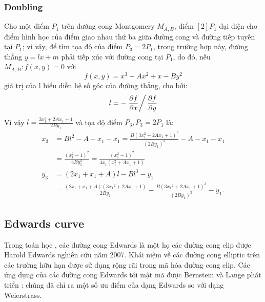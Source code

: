 \documentclass[a4paper,12pt]{report}
\begin{document}
\subsubsection{Doubling}
Cho một điểm $P_{1}$ trên đường cong Montgomery $M_{A, B}$, điểm $[2]P_1$ đại diện cho điểm hình học của điểm giao nhau thứ ba giữa đường cong và đường tiếp tuyến tại $P_{1}$; vì vậy, để tìm tọa độ của điểm $P_3 = 2P_1$, trong trường hợp này, đường thẳng $y  =  lx  +  m$ phải tiếp xúc với đường cong tại $P_{1}$, do đó, nếu $M_{A, B}: f(x, y) = 0$ với
\begin{displaymath}
f(x, y) = x^3 + Ax^2 + x - By^2
\end{displaymath}
giá trị của l biểu diễn hệ số góc của đường thẳng, cho bởi:
\begin{displaymath}
 l=-\left.\frac{\partial f}{\partial x}\right/\frac{\partial f}{\partial y}
\end{displaymath}
Vì vậy $\displaystyle l = \frac{3x_1^2 + 2Ax_1 + 1}{2By_1}$ và tọa độ điểm $P_3,P_3 = 2P_1$ là:
\begin{displaymath}
{\displaystyle {\begin{aligned}x_{3}&=Bl^{2}-A-x_{1}-x_{1}={\frac {B(3x_{1}^{2}+2Ax_{1}+1)^{2}}{(2By_{1})^{2}}}-A-x_{1}-x_{1}\\&={\frac {(x_{1}^{2}-1)^{2}}{4By_{1}^{2}}}={\frac {(x_{1}^{2}-1)^{2}}{4x_{1}(x_{1}^{2}+Ax_{1}+1)}}\\[8pt]y_{3}&=(2x_{1}+x_{1}+A)l-Bl^{3}-y_{1}\\&={\frac {(2x_{1}+x_{1}+A)(3{x_{1}}^{2}+2Ax_{1}+1)}{2By_{1}}}-{\frac {B(3{x_{1}}^{2}+2Ax_{1}+1)^{3}}{(2By_{1})^{3}}}-y_{1}.\end{aligned}}}
\end{displaymath}
\subsection*{Edwards curve}
Trong toán học , các đường cong Edwards là một họ các đường cong elip được Harold Edwards nghiên cứu năm 2007. Khái niệm về các đường cong elliptic trên các trường hữu hạn được sử dụng rộng rãi trong mã hóa đường cong elip. Các ứng dụng của các đường cong Edwards tới mật mã được Bernstein và Lange phát triển : chúng đã chỉ ra một số ưu điểm của dạng Edwards so với dạng Weierstrass.
\end{document}
